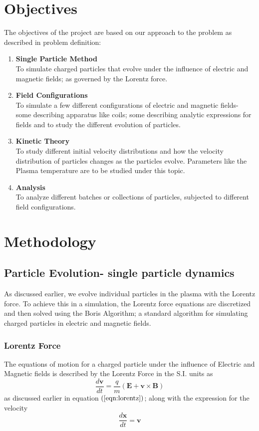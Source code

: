 \documentclass[12pt]{article}
\begin{document}
	\section{Objectives}
	The objectives of the project are based on our approach to the problem as described in problem definition:
	\begin{enumerate}
		\item \textbf{Single Particle Method} \\ 
		To simulate charged particles that evolve under the influence of electric and magnetic fields; as governed by the Lorentz force.
		\item \textbf{Field Configurations} \\
		To simulate a few different configurations of electric and magnetic fields- some describing apparatus like coils; some describing analytic expressions for fields and to study the different evolution of particles.
		\item \textbf{Kinetic Theory} \\
		To study different initial velocity distributions and how the velocity distribution of particles changes as the particles evolve. Parameters like the Plasma temperature are to be studied under this topic.
		\item \textbf{Analysis} \\
		To analyze different batches or collections of particles, subjected to different field configurations.
		
	\end{enumerate}
	
	\section{Methodology}
	
	\subsection{Particle Evolution- single particle dynamics}
	As discussed earlier, we evolve individual particles in the plasma with the Lorentz force. To achieve this in a simulation, the Lorentz force equations are discretized and then solved using the Boris Algorithm; a standard algorithm for simulating charged particles in electric and magnetic fields.

	\subsubsection{Lorentz Force}
	The equations of motion for a charged particle under the influence of Electric and Magnetic fields is described by the Lorentz Force in the S.I. units as
	$$
		\frac{d \textbf{$\boldsymbol{v}$}}{d t} = \frac{q}{m} \left(\textbf{$\mathbf{E}$} + \textbf{$\boldsymbol{v}$} \times \textbf{$\mathbf{B}$} \right)
	$$ as discussed earlier in equation $\left(\ref{eqn:lorentz}\right)$;
	along with the expression for the velocity
	\begin{equation}
		\label{eqn:velocity}
		\frac{d \boldsymbol{x}}{d t} = \boldsymbol{v}
	\end{equation} 
	
\end{document}
